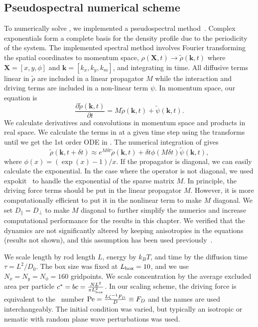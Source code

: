 \subsection{Pseudospectral numerical scheme} 
To numerically solve
, we implemented a pseudospectral
method~\cite{fornberg_practical_98}.  Complex exponentials form a complete basis
for the density profile due to the periodicity of the system. The implemented
spectral method involves Fourier transforming the spatial coordinates to
momentum space, $ \rho(\bm{X},t) \rightarrow  \tilde{ \rho } (\bm{k},t ) $
where $\bm{X} = [x,y,\phi]$ and $\bm{k} = [k_x, k_y, k_m]$, and integrating in
time.  All diffusive terms linear in $\tilde{\rho}$ are included in
a linear propagator $M$ while the interaction and driving terms are included
in a non-linear term $\psi$.  In momentum space, our equation is
%
\begin{equation}
  \label{eqn:k2solve}
  \frac{\partial \tilde{\rho} ( \bm{k}, t )} {\partial t} = 
  M  \tilde{\rho} ( \bm{k}, t ) + 
  \tilde{\psi} ( \bm{k}, t ).
\end{equation}
%
We calculate derivatives and convolutions in momentum space and
products in real space.  We calculate the terms in  at a
given time step using the transforms until we get the 1st order ODE in
. The numerical integration of  gives
%
\begin{equation}
  \tilde{\rho} ( \bm{k}, t + \delta t )
  \approx e^{M \delta t}  \tilde{\rho}( \bm{k}, t ) +   
  \delta t \phi( M \delta t ) \tilde{\psi}( \bm{k}, t ),
\end{equation}
%
where $\phi(x) = (\exp(x) - 1)/x $. If the propagator is diagonal, we can easily
calculate the exponential.  In the case where the operator is not diagonal, we
used expokit~\cite{sidje_expokit_98} to handle the exponential of the sparse
matrix $M$. In principle, the driving force terms should be put in the linear
propagator $M$. However, it is more computationally efficient to put it in the
nonlinear term to make $M$ diagonal. We set
$D_{\parallel} = D_{\perp}$ to make $M$ diagonal to further simplify the
numerics and increase computational performance for the results in this chapter.
We verified that the dynamics are not significantly altered by keeping
anisotropies in the equations (results not shown), and this assumption has been
used previously~\cite{mishra_fluctuations_10}.

We scale length by rod length $L$, energy by $k_B T$, and time by the
diffusion time $\tau = L^2 / D_0$. The box size was fixed at $L_{\mathrm{box}}
= 10$, and we use $N_x = N_y = N_{\phi} = 160$ gridpoints. We
scale concentration by the average excluded area per particle $c^* = bc =
\frac{ N L^2 }{ \pi L_{\mathrm{box}}^2 } $. In our scaling scheme, the driving force
is equivalent to the \peclet~number $\text{Pe} = \frac{ L \zeta^{-1} F_D }{ D } \equiv
F_D$ and the names are used interchangeably.  The initial condition was varied,
but typically an isotropic or nematic with random plane wave perturbations was
used.

